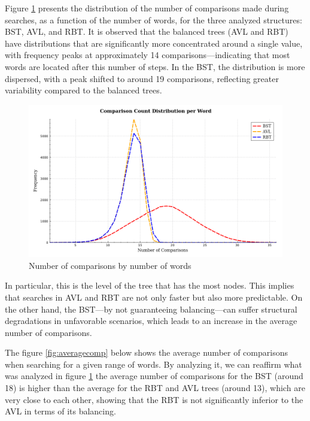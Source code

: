  Figure \ref{fig:comparacoes} presents the distribution of the number of comparisons made
 during searches, as a function of the number of words, for the three analyzed structures:
 BST, AVL, and RBT. It is observed that the balanced trees (AVL and RBT) have distributions
 that are significantly more concentrated around a single value, with frequency peaks at
 approximately 14 comparisons—indicating that most words are located after this
 number of steps. In the BST, the distribution is more dispersed, with a peak
 shifted to around 19 comparisons, reflecting greater variability compared to the balanced trees.

 \begin{figure}[H]
     \centering
     \includegraphics[width=0.8\linewidth]{img/Graph_6_20273.pdf}
     \caption{Number of comparisons by number of words}
     \label{fig:comparacoes}
 \end{figure}


 In particular, this is the level of the tree that has the most nodes. This implies that searches in AVL and RBT are not only faster but also more predictable.
 On the other hand, the BST—by not guaranteeing balancing—can suffer structural degradations in unfavorable scenarios, which leads to an increase in the average number of comparisons.

The figure \ref{fig:averagecomp} below shows the average number of comparisons when searching for a given range of words. 
By analyzing it, we can reaffirm what was analyzed in figure \ref{fig:comparacoes} the average number of comparisons for the BST (around 18) 
is higher than the average for the RBT and AVL trees (around 13), which are very close to each other, showing that the 
RBT is not significantly inferior to the AVL in terms of its balancing.

